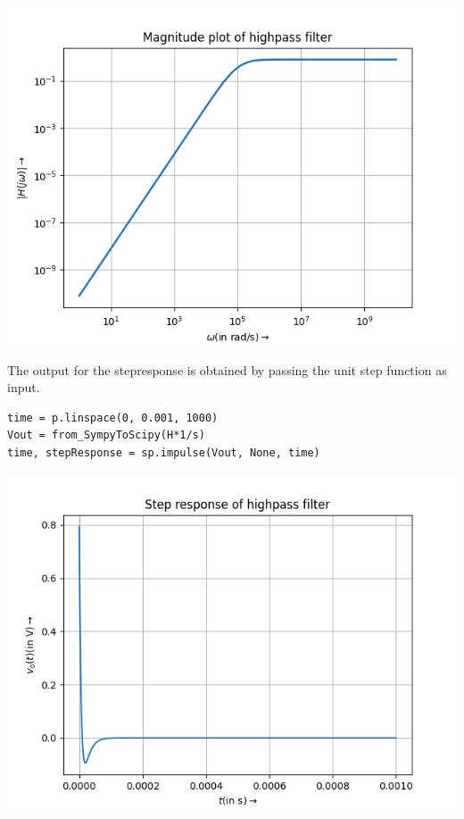 \documentclass[12pt, a4paper]{report}
\begin{document}
\begin{center}
	\includegraphics[scale=0.82]{Figure4.png} 
	\label{fig:rawdata}
\end{center}

The output for the stepresponse is obtained by passing the unit step function as input. 
\begin{verbatim}
time = p.linspace(0, 0.001, 1000)
Vout = from_SympyToScipy(H*1/s)
time, stepResponse = sp.impulse(Vout, None, time)
\end{verbatim}

\begin{center}
	\includegraphics[scale=0.72]{Figure7.png} 
	\label{fig:rawdata}
\end{center}
\end{document}
